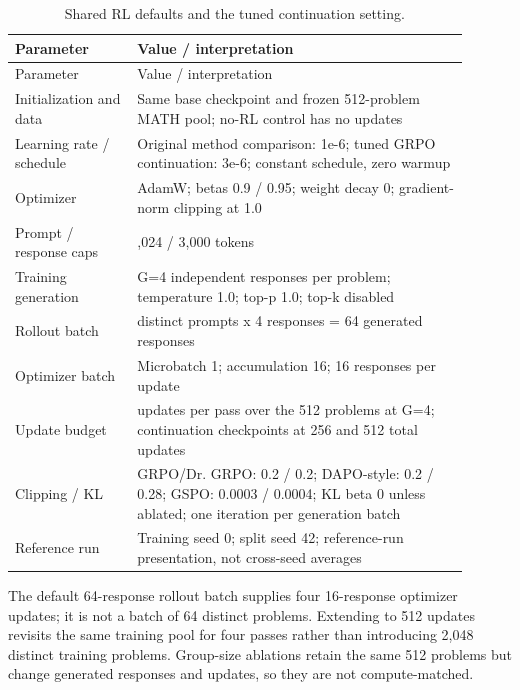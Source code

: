 \begingroup\footnotesize\setlength{\tabcolsep}{3pt}
\begin{longtable}{>{\raggedright\arraybackslash}p{0.2430\linewidth}>{\raggedright\arraybackslash}p{0.6570\linewidth}}
\caption{Shared RL defaults and the tuned continuation setting.}\\
\toprule Parameter & Value /\allowbreak{} interpretation \\
\midrule\endfirsthead
\toprule Parameter & Value /\allowbreak{} interpretation \\
\midrule\endhead
\midrule\multicolumn{2}{r}{Continued on next page}\endfoot
\bottomrule\endlastfoot
Initialization and data & Same base checkpoint and frozen 512-problem MATH pool; no-RL control has no updates \\
Learning rate /\allowbreak{} schedule & Original method comparison: 1e-6; tuned GRPO continuation: 3e-6; constant schedule, zero warmup \\
Optimizer & AdamW; betas 0.9 /\allowbreak{} 0.95; weight decay 0; gradient-norm clipping at 1.0 \\
Prompt /\allowbreak{} response caps & 1,024 /\allowbreak{} 3,000 tokens \\
Training generation & G=4 independent responses per problem; temperature 1.0; top-p 1.0; top-k disabled \\
Rollout batch & 16 distinct prompts x 4 responses = 64 generated responses \\
Optimizer batch & Microbatch 1; accumulation 16; 16 responses per update \\
Update budget & 128 updates per pass over the 512 problems at G=4; continuation checkpoints at 256 and 512 total updates \\
Clipping /\allowbreak{} KL & GRPO/\allowbreak{}Dr. GRPO: 0.2 /\allowbreak{} 0.2; DAPO-style: 0.2 /\allowbreak{} 0.28; GSPO: 0.0003 /\allowbreak{} 0.0004; KL beta 0 unless ablated; one iteration per generation batch \\
Reference run & Training seed 0; split seed 42; reference-run presentation, not cross-seed averages \\
\end{longtable}\endgroup


The default 64-response rollout batch supplies four 16-response optimizer updates; it is not a batch of 64 distinct problems. Extending to 512 updates revisits the same training pool for four passes rather than introducing 2,048 distinct training problems. Group-size ablations retain the same 512 problems but change generated responses and updates, so they are not compute-matched.


